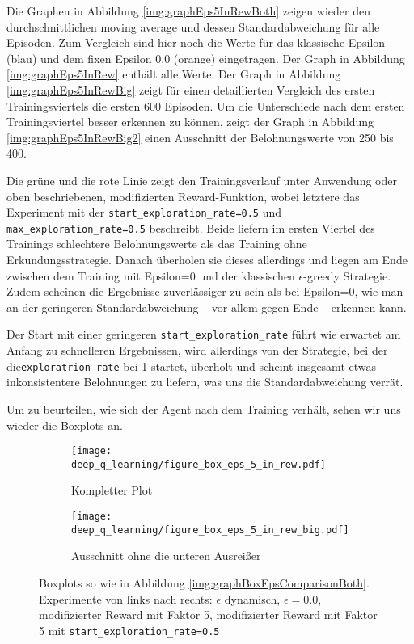 Die Graphen in Abbildung \ref{img:graphEps5InRewBoth} zeigen wieder den durchschnittlichen moving average und dessen Standardabweichung für alle Episoden. Zum Vergleich sind hier noch die Werte für das klassische Epsilon (blau) und dem fixen Epsilon 0.0 (orange) eingetragen. Der Graph in Abbildung \ref{img:graphEps5InRew} enthält alle Werte. Der Graph in Abbildung \ref{img:graphEps5InRewBig} zeigt für einen detaillierten Vergleich des ersten Trainingsviertels die ersten 600 Episoden. Um die Unterschiede nach dem ersten Trainingsviertel besser erkennen zu können, zeigt der Graph in Abbildung \ref{img:graphEps5InRewBig2} einen Ausschnitt der Belohnungswerte von 250 bis 400.

Die grüne und die rote Linie zeigt den Trainingsverlauf unter Anwendung oder oben beschriebenen, modifizierten Reward-Funktion, wobei letztere das Experiment mit der \texttt{start_exploration_rate=0.5} und \texttt{max_exploration_rate=0.5} beschreibt. Beide liefern im ersten Viertel des Trainings schlechtere Belohnungswerte als das Training ohne Erkundungsstrategie. Danach überholen sie dieses allerdings und liegen am Ende zwischen dem Training mit Epsilon=0 und der klassischen $ \epsilon $-greedy Strategie. Zudem scheinen die Ergebnisse zuverlässiger zu sein als bei Epsilon=0, wie man an der geringeren Standardabweichung -- vor allem gegen Ende -- erkennen kann.

Der Start mit einer geringeren \texttt{start_exploration_rate} führt wie erwartet am Anfang zu schnelleren Ergebnissen, wird allerdings von der Strategie, bei der die\linebreak\texttt{exploratrion_rate} bei 1 startet, überholt und scheint insgesamt etwas inkonsistentere Belohnungen zu liefern, was uns die Standardabweichung verrät.

Um zu beurteilen, wie sich der Agent nach dem Training verhält, sehen wir uns wieder die Boxplots an.

\begin{figure}[h]
    \centering
    \begin{subfigure}[b]{0.7\textwidth}
        \texttt{[image: deep\_q\_learning/figure\_box\_eps\_5\_in\_rew.pdf]}
        \caption{Kompletter Plot}
        \label{img:graphBoxEps5InRew}
    \end{subfigure}
    \begin{subfigure}[b]{0.7\textwidth}
        \texttt{[image: deep\_q\_learning/figure\_box\_eps\_5\_in\_rew\_big.pdf]}
        \caption{Ausschnitt ohne die unteren Ausreißer}
        \label{img:graphBoxEps5InRewBig}
    \end{subfigure}
    \caption{Boxplots so wie in Abbildung \ref{img:graphBoxEpsComparisonBoth}. Experimente von links nach rechts: $ \epsilon $ dynamisch, $ \epsilon = 0.0 $, modifizierter Reward mit Faktor 5, modifizierter Reward mit Faktor 5 mit \texttt{start_exploration_rate=0.5}}
    \label{img:graphBoxEps5InRewBoth}
\end{figure}

